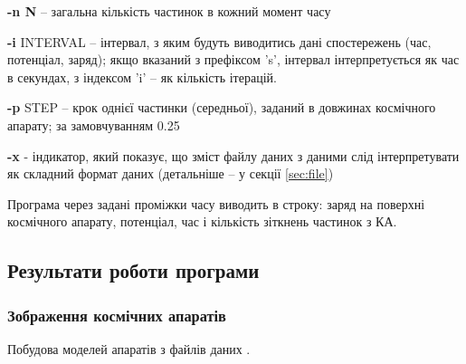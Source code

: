 \documentclass[a4paper,12pt]{article}
\begin{document}
    \textbf{-n N } -- загальна кількість частинок в кожний момент часу
    
    \textbf{-i} INTERVAL -- інтервал, з яким будуть виводитись дані спостережень (час, потенціал, заряд); якщо вказаний з префіксом 's', інтервал інтерпретується як час в секундах, з індексом 'i' -- як кількість ітерацій.
    
    \textbf{-p} STEP -- крок однієї частинки (середньої), заданий в довжинах космічного апарату; за замовчуванням 0.25
    
    \textbf{-x} - індикатор, який показує, що зміст файлу даних з даними слід інтерпретувати як складний формат даних (детальніше -- у секції \ref{sec:file})
    
Програма через задані проміжки часу виводить в строку: заряд на поверхні космічного апарату, потенціал, час і кількість зіткнень частинок з КА.
 
\subsection{Результати роботи програми}

\subsubsection{Зображення космічних апаратів}
Побудова моделей апаратів з файлів даних \cite{nasa}.
\end{document}
